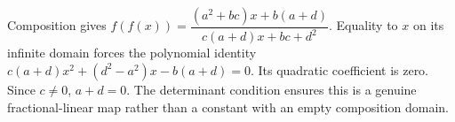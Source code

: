Composition gives $f(f(x))=\dfrac{(a^2+bc)x+b(a+d)}{c(a+d)x+bc+d^2}$. Equality to $x$ on its infinite domain forces the polynomial identity $c(a+d)x^2+(d^2-a^2)x-b(a+d)=0$. Its quadratic coefficient is zero. Since $c\ne0$, $\boxed{a+d=0}$. The determinant condition ensures this is a genuine fractional-linear map rather than a constant with an empty composition domain.
